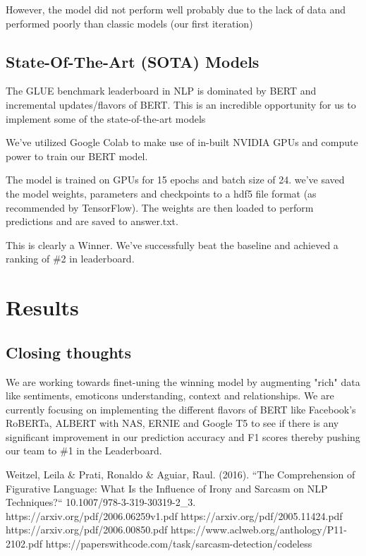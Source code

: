 \documentclass[conference]{IEEEtran}
\begin{document}
However, the model did not perform well probably due to the lack of data and performed poorly than classic models (our first iteration)

\subsection{State-Of-The-Art (SOTA) Models}

The GLUE benchmark leaderboard in NLP is dominated by BERT and incremental updates/flavors of BERT. This is an incredible opportunity for us to implement some of the state-of-the-art models 

We’ve utilized Google Colab to make use of in-built NVIDIA GPUs and compute power to train our BERT model.

The model is trained on GPUs for 15 epochs and batch size of 24. we’ve saved the model weights, parameters and checkpoints to a hdf5 file format (as recommended by TensorFlow). The weights are then loaded to perform predictions and are saved to answer.txt.

This is clearly a Winner. We’ve successfully beat the baseline and achieved a ranking of \#2 in leaderboard.

\section{Results}

\subsection{Closing thoughts}
We are working towards finet-uning the winning model by augmenting "rich" data like sentiments, emoticons understanding, context and relationships. We are currently focusing on implementing the different flavors of BERT like  Facebook’s RoBERTa, ALBERT with NAS, ERNIE and Google T5 to see if there is any significant improvement in our prediction accuracy and F1 scores thereby pushing our team to \#1 in the Leaderboard.


\begin{thebibliography}{00}
	 Weitzel, Leila \& Prati, Ronaldo \& Aguiar, Raul. (2016). ``The Comprehension of Figurative Language: What Is the Influence of Irony and Sarcasm on NLP Techniques?`` 10.1007/978-3-319-30319-2\_3. 
	 https://arxiv.org/pdf/2006.06259v1.pdf
	 https://arxiv.org/pdf/2005.11424.pdf
	 https://arxiv.org/pdf/2006.00850.pdf
	 https://www.aclweb.org/anthology/P11-2102.pdf
	 https://paperswithcode.com/task/sarcasm-detection/codeless

\end{thebibliography}
\end{document}
